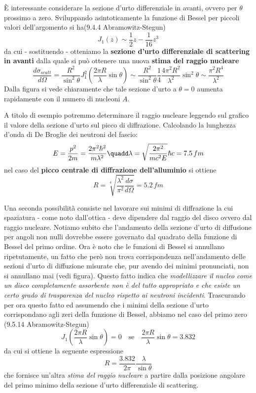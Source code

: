 È interessante considerare la sezione d'urto differenziale in avanti, ovvero per $\theta$ prossimo a zero.
Sviluppando asintoticamente la funzione di Bessel per piccoli valori dell'argomento si ha(9.4.4 Abramowitz-Stegun\cite{AbramSteg})
\[
	J_{1}(z) \sim \frac{1}{2}z - \frac{1}{16}z^{3}
\]
da cui - sostituendo - otteniamo la \textbf{sezione d'urto differenziale di scattering in avanti} dalla quale si può ottenere una nuova \textbf{stima del raggio nucleare}
\[
	\frac{d\sigma_{scatt}}{d \Omega} = \frac{R^{2}}{\sin ^{2}\theta}J_{1}^{2}\left( \frac{2 \pi R}{\lambda} \sin \theta \right) \sim \frac{R^{2}}{\sin ^{2}\theta} \frac{1}{4} \frac{4 \pi^{2} R^{2}}{\lambda^{2}} \sin ^{2} \theta \sim \frac{\pi^{2}R^{4}}{\lambda^{2}}
\]
Dalla figura si vede chiaramente che tale sezione d'urto a $\theta=0$ aumenta rapidamente con il numero di nucleoni $A$.

A titolo di esempio potremmo determinare il raggio nucleare leggendo sul grafico il valore della sezione d'urto sul picco di
diffrazione.
Calcolando la lunghezza d'onda di De Broglie dei neutroni del fascio:
\[
 E = \frac{{p}^{2}}{2m} = \frac{2 \pi^2 \hslash^2}{m \lambda^2} \quadd
 \lambda = \sqrt{\frac{2 \pi^2}{m c^2 E}} \hslash c = 7.5 \, fm
\]
nel caso del \textbf{picco centrale di diffrazione dell'alluminio} si ottiene
\[
 R = \sqrt[4]{\frac{\lambda^2}{\pi^2} \frac{d \sigma}{d \Omega}} = 5.2 \, fm
\]

Una seconda possibilità consiste nel lavorare sui minimi di diffrazione la cui spaziatura - come noto dall'ottica - deve dipendere dal raggio del disco ovvero dal raggio nucleare.
Notiamo subito che l’andamento della sezione d’urto di diffusione per angoli non nulli dovrebbe essere governato dal quadrato della funzione di Bessel del primo ordine.
Ora è noto che le funzioni di Bessel si annullano ripetutamente, un fatto che però non trova corrispondenza nell’andamento
delle sezioni d’urto di diffuzione misurate che, pur avendo dei minimi pronunciati, non si annullano mai (vedi figura).
Questo fatto indica che \emph{modellizzare il nucleo come un disco completamente assorbente non è del tutto appropriato e che esiste un certo grado di trasparenza del nucleo rispetto ai neutroni incidenti}.
Trascurando per ora questo fatto ed assumendo che i minimi della sezione d’urto corrispondano agli zeri della funzione di Bessel, abbiamo nel caso del primo zero (9.5.14 Abramowitz-Stegun)
\[
	J_{1}\left( \frac{2 \pi R}{\lambda}\sin \theta \right) = 0  \quad \text{se}
	\quad \frac{2 \pi R}{\lambda}\sin \theta = 3.832
\]
da cui si ottiene la seguente espressione
\[
	R = \frac{3.832}{2 \pi} \frac{\lambda}{\sin \theta}
\] che fornisce un'altra \emph{stima del raggio nucleare} a partire dalla posizione angolare del primo minimo della
sezione d'urto differenziale di scattering.

